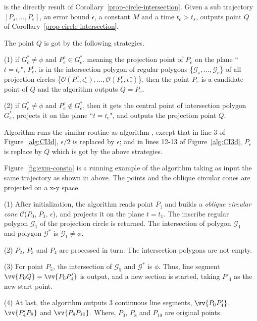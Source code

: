 is the directly result of Corollary~\ref{prop-circle-intersection}.
Given a sub trajectory $[P_s,...,P_e]$, an error bound $\epsilon$, a constant $M$ and a time $t_c > t_s$, \cista outputs point $Q$ of Corollary~\ref{prop-circle-intersection}.

 The point $Q$ is got by the following strategies.

\vspace{1ex}
\ni (1) if $G^*_e \ne \phi$ and $P^c_e \in G^*_e$, meaning the projection point of $P_e$ on the plane ``$t=t_c$", \ie $P^c_e$, is in the intersection polygon of regular polygons \{$\mathcal{G}_s, \dots, \mathcal{G}_e$\} of all projection circles \{$\mathcal{O}(P^c_s, \epsilon^c_s), \ldots, \mathcal{O}(P^c_e, \epsilon^c_e)$\}, then the point $P_e$ is a candidate point of $Q$ and the algorithm outputs $Q=P_e$.

\vspace{1ex}
\ni (2) if $G^*_e \ne \phi$ and $P^c_e \notin G^*_e$, then it gets the central point of intersection polygon $G^*_e$, projects it on the plane ``$t=t_e$", and outputs the projection point $Q$.

\vspace{1ex}
Algorithm \cista runs the similar routine as algorithm \cist, except that in line 3 of Figure~\ref{alg:CI3d}, $\epsilon/2$ is replaced by $\epsilon$; and in lines 12-13 of Figure~\ref{alg:CI3d}, $P_e$ is replace by $Q$ which is got by the above strategies.



\begin{example}
\label{exm-alg-conesta}
Figure~\ref{fig:exm-consta} is a running example of the \cista algorithm taking as input the same trajectory as shown in above.
The points and the oblique circular cones are projected on a x-y space.

\ni (1) After initialization, the \cista algorithm reads point $P_1$ and builds a \emph{oblique circular cone} $\mathcal{C}$($P_0$, $P_{1}$, $\epsilon$), and projects it on the plane $t=t_1$. The inscribe regular polygon $\mathcal{G}_1$ of the projection circle is returned. The intersection of polygon $\mathcal{G}_1$ and polygon $\mathcal{G}^*$ is $\mathcal{G}_1 \ne \phi$.

\ni (2) $P_2$, $P_3$ and $P_4$ are processed in turn. The intersection polygons are not empty.

\ni (3) For point $P_5$, the intersection of $\mathcal{G}_5$ and $\mathcal{G}^*$ is $\phi$. Thus, line segment $\vv{P_0Q} =\vv{P_0P'_4}$ is output, and a new section is started, taking $P'_4$ as the new start point.

\ni (4) At last, the algorithm outputs 3 continuous line segments, \ie $\vv{P_0P'_4}$, $\vv{P'_4P_8}$ and $\vv{P_8P_{10}}$. Where, $P_0$, $P_8$ and $P_{10}$ are original points.
\end{example}



